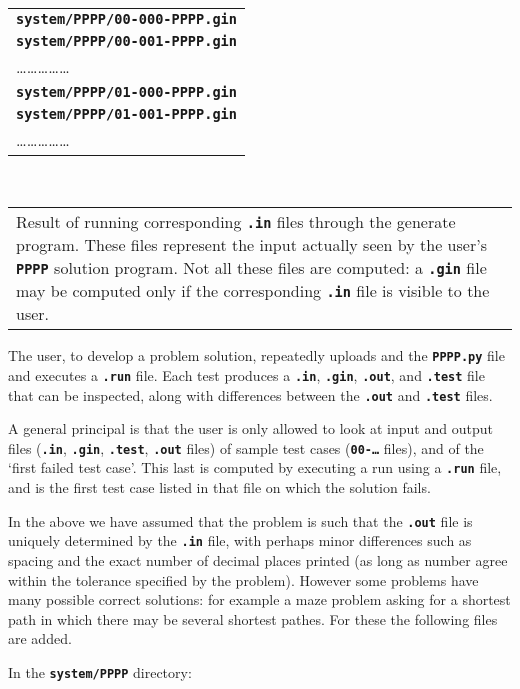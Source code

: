 \documentclass[12pt]{article}
\newcommand{\TT}[1]{{\tt \bfseries #1}}
\newenvironment{indpar}[1][0.4in]%
	{\begin{list}{}%
		     {\setlength{\itemsep}{0in}%
		      \setlength{\topsep}{0in}%
		      \setlength{\parsep}{1ex}%
		      \setlength{\labelwidth}{#1}%
		      \setlength{\leftmargin}{#1}%
		      \addtolength{\leftmargin}{\labelsep}}%
	 \item}%
	{\end{list}}
\newcommand{\ITEM}{\hspace*{-0.2in}}
\begin{document}
\begin{indpar}
\\[1ex]
\ITEM\begin{tabular}[t]{@{}l}
     \TT{system/PPPP/00-000-PPPP.gin} \\
     \TT{system/PPPP/00-001-PPPP.gin} \\
     \ldots\ldots\ldots\ldots\ldots \\
     \TT{system/PPPP/01-000-PPPP.gin} \\
     \TT{system/PPPP/01-001-PPPP.gin} \\
     \ldots\ldots\ldots\ldots\ldots \\
     \end{tabular}
     ~~~~
     \begin{tabular}[t]{p{3in}}
     Result of running corresponding \TT{.in} files through the 
     generate program.  These files represent the input actually
     seen by the user's \TT{PPPP} solution program.  Not all
     these files are computed: a \TT{.gin} file may be computed
     only if the corresponding \TT{.in} file is visible to the
     user.
     \end{tabular}

\end{indpar}

The user, to develop a problem solution, repeatedly uploads and
the \TT{PPPP.py} file and executes a \TT{.run} file.
Each test produces a \TT{.in},
\TT{.gin}, \TT{.out}, and \TT{.test} file that can be inspected,
along with differences between the \TT{.out} and \TT{.test}
files.

A general principal is that the user is only allowed to look
at input and output files (\TT{.in}, \TT{.gin}, \TT{.test}, \TT{.out} files)
of sample test cases (\TT{00-\ldots} files), and of the `first
failed test case'.  This last is computed by executing a run
using a \TT{.run} file, and is the first test case listed in
that file on which the solution fails.

In the above we have assumed that the problem is such that the
\TT{.out} file is uniquely determined by the \TT{.in} file,
with perhaps minor differences such as spacing and
the exact number of decimal places printed (as long as number
agree within the tolerance specified by the problem).
However some problems have many possible correct solutions:
for example a maze problem asking for a shortest path in which
there may be several shortest pathes.
For these the following files are added.

In the \TT{system/PPPP} directory:
\end{document}
